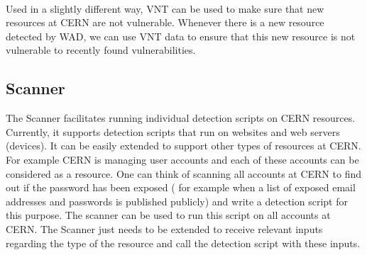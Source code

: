 \paragraph{}
Used in a slightly different way, VNT can be used to make sure that new resources at CERN are not vulnerable. Whenever there is a new resource detected by WAD, we can use VNT data to ensure that this new resource is not vulnerable to recently found vulnerabilities.
\subsection{Scanner}
The Scanner facilitates running individual detection scripts on CERN resources. Currently, it supports detection scripts that run on websites and web servers (devices). It can be easily extended to support other types of resources at CERN. For example CERN is managing user accounts and each of these accounts can be considered as a resource. One can think of scanning all accounts at CERN to find out if the password has been exposed ( for example when a list of exposed email addresses and passwords is published publicly) and write a detection script for this purpose. The scanner can be used to run this script on all accounts at CERN. The Scanner just needs to be extended to receive relevant inputs regarding the type of the resource and call the detection script with these inputs.
\\